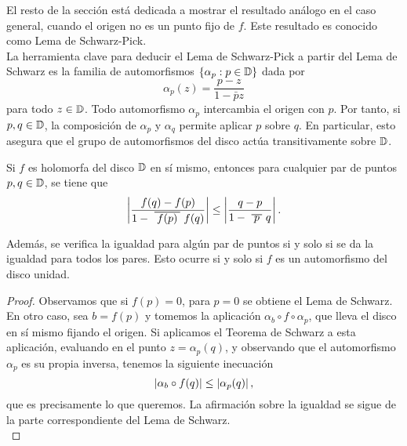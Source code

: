 El resto de la sección está dedicada a mostrar el resultado análogo en el caso general, cuando el origen no es un punto fijo de $f$. Este resultado es conocido como Lema de Schwarz-Pick. \\ %

La herramienta clave para deducir el Lema de Schwarz-Pick a partir del Lema de Schwarz es la familia de automorfismos $\{\alpha_p: p\in \mathbb{D}\}$ dada por
\begin{equation*}
    \alpha_p (z) = \frac{p-z}{1 - \bar{p}z}
\end{equation*}
para todo $z \in \mathbb{D}$. Todo automorfismo $\alpha_p$ intercambia el origen con $p$. Por tanto, si $p, q \in \mathbb{D}$, la composición de $\alpha_p$ y $\alpha_q$ permite aplicar $p$ sobre $q$. En particular, esto asegura que el grupo de automorfismos del disco actúa transitivamente sobre $\mathbb{D}$. \\

\begin{theorem}
    Si $f$ es holomorfa del disco $\mathbb{D}$ en sí mismo, entonces para cualquier par de puntos $p, q \in \mathbb{D}$, se tiene que
    \begin{equation*}
        \abs{\frac{f(q) - f(p)}{1 - \xbar{f(p)}f(q)}} \leq \abs{\frac{q-p}{1 - \xbar{p}q}}.
    \end{equation*}

    Además, se verifica la igualdad para algún par de puntos si y solo si se da la igualdad para todos los pares. Esto ocurre si y solo si $f$ es un automorfismo del disco unidad.
\end{theorem}

\begin{proof}
    Observamos que si $f(p) = 0$, para $p = 0$ se obtiene el Lema de Schwarz. En otro caso, sea $b = f(p)$ y tomemos la aplicación $\alpha_b \circ f \circ \alpha_p$, que lleva el disco en sí mismo fijando el origen. Si aplicamos el Teorema de Schwarz a esta aplicación, evaluando en el punto $z = \alpha_p(q)$, y observando que el automorfismo $\alpha_p$ es su propia inversa, tenemos la siguiente inecuación
    \begin{equation*}
        \left\lvert\alpha_b \circ f(q)\right\rvert \leq \left\lvert\alpha_p(q)\right\rvert,
    \end{equation*}
    que es precisamente lo que queremos. La afirmación sobre la igualdad se sigue de la parte correspondiente del Lema de Schwarz. \\
\end{proof}


